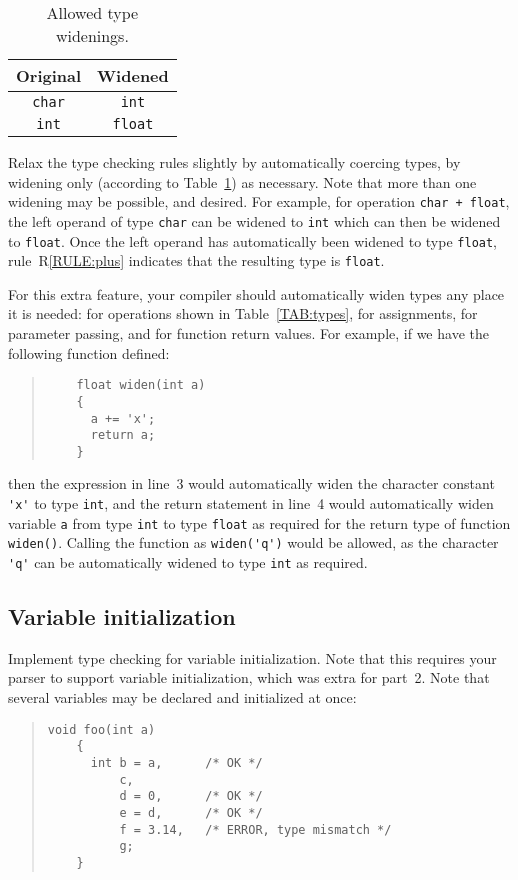 \documentclass{article}
\newcounter{rule}
\newcommand{\parser}{2}
\begin{document}
\begin{table}[t]
\centering
  \begin{tabular}{c|c}
    Original & Widened \\ \hline
    {\tt char} & {\tt int} \\
    {\tt int}  & {\tt float}
  \end{tabular}
\caption{Allowed type widenings.} \label{TAB:widenings}
\end{table}

Relax the type checking rules slightly by
automatically coercing types,
by widening only (according to Table~\ref{TAB:widenings})
as necessary.
Note that more than one widening may be possible, and desired.
For example, for operation {\tt char + float},
the left operand of type {\tt char} can be widened to {\tt int}
which can then be widened to {\tt float}.
Once the left operand has automatically been widened to type {\tt float},
rule~R\ref{RULE:plus}
  indicates that the resulting type is {\tt float}.

For this extra feature,
your compiler should automatically widen types any place it is needed:
for operations shown in Table~\ref{TAB:types},
for assignments,
for parameter passing,
and for function return values.
For example, if we have the following function defined:
\begin{quote}
  \begin{lstlisting}
    float widen(int a)
    {
      a += 'x';
      return a;
    }
  \end{lstlisting}
\end{quote}
then the expression in line~3 would automatically widen
the character constant \verb|'x'| to type {\tt int},
and the return statement in line~4 would automatically
widen variable {\tt a} from type {\tt int} to type {\tt float}
as required for the return type of function {\tt widen()}.
Calling the function as \verb|widen('q')|
would be allowed, as the character \verb|'q'| can
be automatically widened to type {\tt int} as required.


\subsection{Variable initialization}
\label{SEC:initialize}

Implement type checking for variable initialization.
Note that this requires your parser to support variable initialization,
which was extra for part~\parser.
Note that several variables may be declared and initialized at once:
\begin{quote}
  \begin{lstlisting}[numbers=none]
    void foo(int a)
    {
      int b = a,      /* OK */
          c,
          d = 0,      /* OK */
          e = d,      /* OK */
          f = 3.14,   /* ERROR, type mismatch */
          g;
    }
  \end{lstlisting}
\end{quote}
\end{document}
